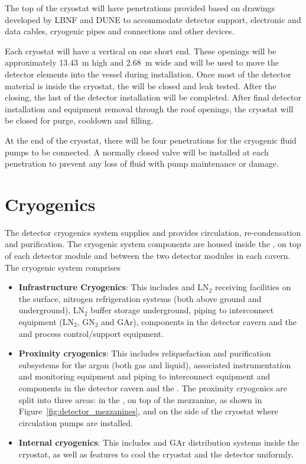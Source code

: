 The top of the cryostat will have penetrations provided based on
drawings developed by LBNF and DUNE to accommodate detector support,
electronic and data cables, cryogenic pipes and connections and other
devices.

Each cryostat will have a vertical  on one short end.
These openings will be approximately \SI{13.43}{\meter} high and
\SI{2.68}{\meter} wide and will be used to move the detector elements
into the vessel during installation.  Once most of the detector
material is inside the cryostat, the  will be closed and
leak tested.  After the  closing, the last of the detector
installation will be completed. After final detector installation and
equipment removal through the roof openings, the cryostat will be
closed for purge, cooldown and filling.

At the  end of the cryostat, there will be four penetrations for
the cryogenic fluid pumps to be connected.  A normally closed valve
will be installed at each penetration to prevent any loss of fluid
with pump maintenance or damage.

\section{Cryogenics}
\label{sec:fdsp-coord-cryogenics}


The detector cryogenics system supplies  and provides
circulation, re-condensation and purification. The cryogenic system
components are housed inside the , on top of each detector module
and between the two detector modules in each cavern. The cryogenic system comprises
\begin{itemize}
\item {\bf Infrastructure Cryogenics}: This includes  and LN$_2$ receiving
  facilities on the surface, nitrogen refrigeration systems (both
  above ground and underground), LN$_2$ buffer storage
  underground, piping to interconnect equipment (LN$_2$, GN$_2$ and GAr),
  components in the detector cavern and the  and process control/support
  equipment.
\item {\bf Proximity cryogenics}: This includes reliquefaction 
  and purification subsystems for the argon (both gas and liquid), associated
  instrumentation and monitoring equipment and  piping to
  interconnect equipment and components in the detector cavern and the
  . The proximity cryogenics are split into three areas: in the
  , on top of the mezzanine, as shown in Figure~\ref{fig:detector_mezzanines},
  and on the side of the cryostat where  circulation pumps are installed.
\item {\bf Internal cryogenics}: This includes  and GAr distribution
  systems inside the cryostat, as well as features to cool the
  cryostat and the detector uniformly.
\end{itemize}

